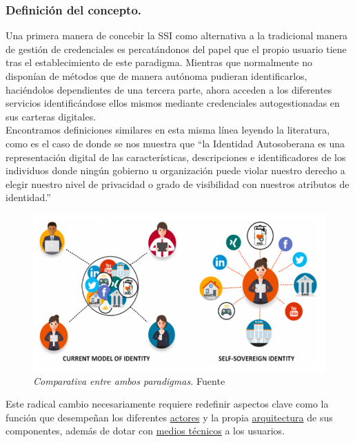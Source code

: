 \documentclass[../main.tex]{subfiles}
\begin{document}
\subsubsection{Definición del concepto.}
Una primera manera de concebir la \acrfull{SSI} como alternativa a la tradicional manera de gestión de credenciales es percatándonos del papel que el propio usuario tiene tras el establecimiento de este paradigma. Mientras que normalmente no disponían de métodos que de manera autónoma pudieran identificarlos, haciéndolos dependientes de una tercera parte, ahora acceden a los diferentes servicios identificándose ellos mismos mediante credenciales autogestionadas en sus carteras digitales.
\\

Encontramos definiciones similares en esta misma línea leyendo la literatura, como es el caso de \cite{EvaluationFramework} donde se nos muestra que ``la Identidad Autosoberana es una representación digital de las características, descripciones e identificadores de los individuos donde ningún gobierno u organización puede violar nuestro derecho a elegir nuestro nivel de privacidad o grado de visibilidad con nuestros atributos de identidad.''
\\

\begin{figure}[htbp]
    \centering
    \includegraphics[width=0.75\linewidth]{images/SSI_vs_Traditional.png}
    \caption{\textit{Comparativa entre ambos paradigmas.} Fuente \cite{DefSSI}}
    \label{fig:comparacion}
\end{figure}

Este radical cambio necesariamente requiere redefinir aspectos clave como la función que desempeñan los diferentes \hyperref[Actores y sus funciones en el paradigma]{actores} y la propia \hyperref[Arquitectura y marco de referencia]{arquitectura} de sus componentes, además de dotar con \hyperref[Carteras de Identidad Digital]{medios técnicos} a los usuarios.
\end{document}
